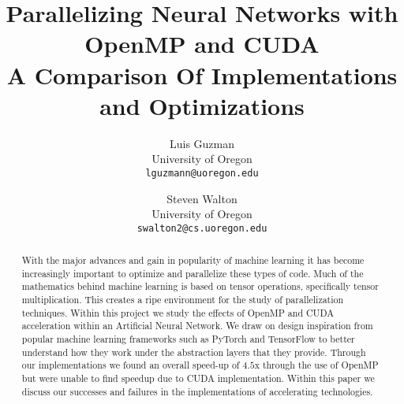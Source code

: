 \documentclass[final]{cvpr}
\begin{document}
\title{Parallelizing Neural Networks with OpenMP and CUDA\\
\small{A Comparison Of Implementations and Optimizations}}

\author{Luis Guzman \\
University of Oregon\\
{\tt\small lguzmann@uoregon.edu}
\and
Steven Walton\\
University of Oregon\\

{\tt\small swalton2@cs.uoregon.edu}
}

\maketitle


\begin{abstract}
With the major advances and gain in popularity of machine learning it has become
increasingly important to optimize and parallelize these types of code. Much of
the mathematics behind machine learning is based on tensor operations,
specifically tensor multiplication. This creates a ripe environment for the
study of parallelization techniques. Within this project we study the effects of
OpenMP and CUDA acceleration within an Artificial Neural Network. We draw on
design inspiration from popular machine learning frameworks such as PyTorch
and TensorFlow to better understand how they work under the abstraction layers
that they provide. Through our implementations we found an overall speed-up of
$4.5$x through the use of OpenMP but were unable to find speedup due to CUDA
implementation. Within this paper we discuss our successes and failures in
the implementations of accelerating technologies.
\end{abstract}






{\small

%

}
\end{document}
